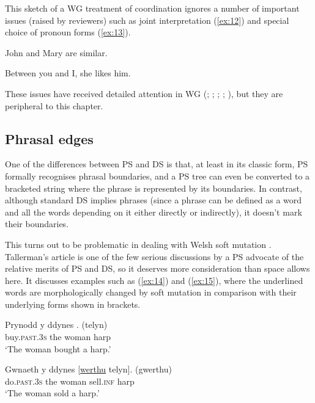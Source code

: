 \documentclass[output=paper
	        ,collection
	        ,collectionchapter
 	        ,biblatex
                ,babelshorthands
                ,newtxmath
                ,draftmode
                ,colorlinks, citecolor=brown
]{./langsci/langscibook}
\begin{document}
This sketch of a WG treatment of coordination ignores a number of important issues (raised by reviewers) such as joint interpretation (\ref{ex:12}) and special choice of pronoun forms (\ref{ex:13}).

\begin{exe}
	\ex \label{ex:12} John and Mary are similar.

	\ex \label{ex:13} Between you and I, she likes him.
\end{exe}

These issues have received detailed attention in WG (\citealt[Chapter~5]{Hudson84a-u}; \citeyear{Hudson88a}; \citeyear[Chapter~14]{Hudson90a-u}; \citeyear{Hudson1995}; \citeyear[175--181, 304--307]{Hudson2010b-u}), but they are peripheral to this chapter.


\subsection{Phrasal edges}
\label{sec:4.3}

One of the differences between PS and DS is that, at least in its classic form, PS formally recognises phrasal boundaries, and a PS tree can even be converted to a bracketed string where the phrase is represented by its boundaries. In contrast, although standard DS implies phrases (since a phrase can be defined as a word and all the words depending on it either directly or indirectly), it doesn’t mark their boundaries.

This turns out to be problematic in dealing with Welsh soft mutation \citep{Tallerman2009}. Tallerman’s article is one of the few serious discussions by a PS advocate of the relative merits of PS and DS, so it deserves more consideration than space allows here. It discusses examples such as (\ref{ex:14}) and (\ref{ex:15}), where the underlined words are morphologically changed by soft mutation in comparison with their underlying forms shown in brackets.

\begin{exe}
	\ex \label{ex:14}
	\gll Prynodd y ddynes \underline{}. (telyn)\\
	buy.\textsc{past}.3\textsc{s} the woman harp\\
	\glt ‘The woman bought a harp.’

	\ex \label{ex:15}
	\gll Gwnaeth y ddynes [\underline{werthu} telyn]. (gwerthu)\\
	do.\textsc{past}.3\textsc{s} the woman sell.\textsc{inf} harp\\
	\glt ‘The woman sold a harp.’
\end{exe}
\end{document}
